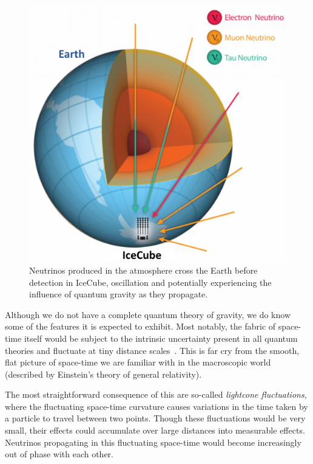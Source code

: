 \documentclass[a4paper,11pt]{article}
\begin{document}
\begin{figure} %
    \centering
		\includegraphics[width=1.\linewidth]{images/atmo_osc.png}
		\caption{Neutrinos produced in the atmosphere cross the Earth before detection in IceCube, oscillation and potentially experiencing the influence of quantum gravity as they propagate.}
		\vspace{-7pt}
		\label{fig:osc}
\end{figure}

Although we do not have a complete quantum theory of gravity, we do know some of the features it is expected to exhibit. Most notably, the fabric of space-time itself would be subject to the intrinsic uncertainty present in all quantum theories and fluctuate at tiny distance scales~\cite{PhysRev.97.511, Hawking}. This is far cry from the smooth, flat picture of space-time we are familiar with in the macroscopic world (described by Einstein's theory of general relativity). 

The most straightforward consequence of this are so-called \textit{lightcone fluctuations}\cite{PauliLightcone, Ford1999, gr-qc/9909085}, where the fluctuating space-time curvature causes variations in the time taken by a particle to travel between two points. Though these fluctuations would be very small, their effects could accumulate over large distances into measurable effects. Neutrinos propagating in this fluctuating space-time would become increasingly out of phase with each other.
\end{document}
